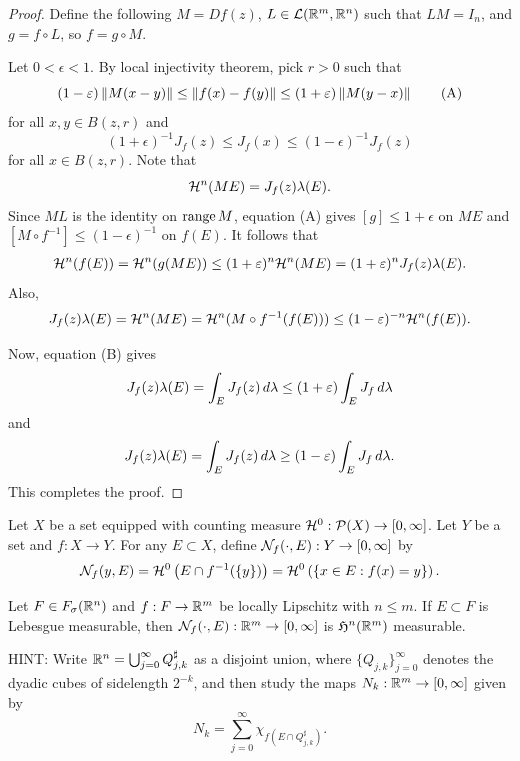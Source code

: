 \documentclass[a4paper]{article}
\begin{document}
\begin{proof}
  Define the following $M = Df(z)$, $L \in \mathcal{L}(\mathbb{R}^m, \mathbb{R}^n)$ such that $L M
    = I_n$, and $g = f \circ L$, so $f = g \circ M$.

  Let $0 < \epsilon < 1$. By local injectivity theorem, pick $r > 0$ such
  that
  \[
    (1 - \varepsilon) \left\lVert M (x - y)\right\rVert
    \leq \left\lVert f(x) - f(y)\right\rVert \leq
    (1 + \varepsilon) \left\lVert M (y - x)\right\rVert
    \tag{A}
  \]
  for all $x, y \in B(z, r)$ and
  \[
    (1 + \epsilon)^{-1} J_f(z)
    \leq J_f(x) \leq
    (1 - \epsilon)^{-1} J_f(z)
    \tag{B}
  \]
  for all $x \in B(z, r)$. Note that
  \[
    \mathcal{H}^n (ME) = J_f(z) \lambda(E).
  \]
  Since $ML$ is the identity on $\operatorname{range} M$, equation (A) gives $[g] \leq 1 +
  \epsilon$ on $ME$ and $[M \circ f^{-1}] \leq (1 - \epsilon)^{-1}$ on
  $f(E)$. It follows that
  \[
    \begin{aligned}
      \mathcal{H}^n (f(E)) = \mathcal{H}^n(g(ME))
      \leq (1 + \varepsilon)^n \mathcal{H}^n (ME)
      = (1 + \varepsilon)^n J_f(z) \lambda(E).
    \end{aligned}
  \]
  Also,
  \[
    J_f(z) \lambda (E) = \mathcal{H}^n (ME)
    = \mathcal{H}^n (M \circ f^{-1} (f(E)))
    \leq (1 - \varepsilon)^{-n} \mathcal{H}^n (f(E)).
  \]

  Now, equation (B) gives
  \[
    J_f(z) \lambda(E)
    = \int_E J_f(z) \, d \lambda
    \leq (1 + \varepsilon) \int_E J_f \, d \lambda
  \]
  and
  \[
    J_f(z) \lambda(E)
    = \int_E J_f(z) \, d \lambda
    \geq (1 - \varepsilon) \int_E J_f \, d \lambda.
  \]
  This completes the proof.
\end{proof}

\begin{defi}
  Let $X$ be a set equipped with counting measure $\mathcal{H}^0 : \mathcal{P}(X) \to [0,
      \infty]$. Let $Y$ be a set and $f: X \to Y$. For any $E \subset X$,
  define $\mathcal{N}_f (\cdot, E) : Y \to [0, \infty]$ by
  \[
    \mathcal{N}_f(y, E) = \mathcal{H}^0 \left( E \cap f^{-1} (\{y\}) \right)
    = \mathcal{H}^0 \left( \left\{ x \in E: f(x) = y \right\} \right).
  \]
\end{defi}

\begin{thm}
  Let $F \in F_\sigma(\mathbb{R}^n)$ and $f: F \to \mathbb{R}^m$ be locally Lipschitz with $n
    \leq m$. If $E \subset F$ is Lebesgue measurable, then $\mathcal{N}_f(\cdot,
    E) : \mathbb{R}^m \to [0, \infty]$ is $\mathfrak{H}^n(\mathbb{R}^m)$ measurable.
\end{thm}

HINT: Write $\mathbb{R}^n = \bigcup_{j=0}^\infty Q_{j,k}^\sharp$ as a disjoint
union, where $\{Q_{j,k}\}_{j=0}^\infty$ denotes the dyadic cubes of
sidelength $2^{-k}$, and then study the maps $N_k : \mathbb{R}^m \to [0,\infty]$
given by
\[
  N_k = \sum_{j=0}^\infty \chi_{f(E \cap Q_{j,k}^\sharp)}.
\]
\end{document}

